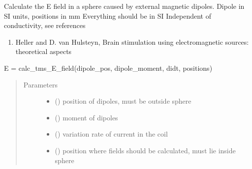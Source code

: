 \documentclass[letterpaper,10pt,english,openany,oneside]{sphinxmanual}
\begin{document}
\begin{fulllineitems}
\label{\detokenize{pygpc:pygpc.testfun.calc_tms_E_field}}
Calculate the E field in a sphere caused by external magnetic dipoles.
Dipole in SI units, positions in mm
Everything should be in SI
Independent of conductivity, see references
\begin{enumerate}
\def\theenumi{\Alph{enumi}}
\def\labelenumi{\theenumi .}
\makeatletter\def\p@enumii{\p@enumi \theenumi .}\makeatother
\setcounter{enumi}{11}
\item {} 
Heller and D. van Hulsteyn, Brain stimulation using electromagnetic sources: theoretical aspects

\end{enumerate}

E = calc\_tms\_E\_field(dipole\_pos, dipole\_moment, didt, positions)
\begin{quote}\begin{description}
\item[{Parameters}] \leavevmode\begin{itemize}
\item {} 
 (\sphinxstyleliteralemphasis{\sphinxupquote{{[}}}\sphinxstyleliteralemphasis{\sphinxupquote{{]} }}) \textendash{} position of dipoles, must be outside sphere

\item {} 
 (\sphinxstyleliteralemphasis{\sphinxupquote{{[}}}\sphinxstyleliteralemphasis{\sphinxupquote{{]} }}) \textendash{} moment of dipoles

\item {} 
 () \textendash{} variation rate of current in the coil

\item {} 
 (\sphinxstyleliteralemphasis{\sphinxupquote{{[}}}\sphinxstyleliteralemphasis{\sphinxupquote{{]} }}) \textendash{} position where fields should be calculated, must lie inside sphere


\end{itemize}
\end{description}
\end{quote}
\end{fulllineitems}
\end{document}
